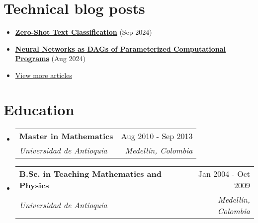 \documentclass[letterpaper,11pt]{article}
\makeatletter
\newcommand{\resumeSubheading}[4]{
  \vspace{-2pt}
  \item[]
  \begin{tabular*}{\textwidth}{@{\extracolsep{\fill}}l r}
    \textbf{#1} & #2 \\
    \textit{#3} & \textit{#4} \\
  \end{tabular*}
  \vspace{-5pt}
}
\newcommand{\normalfaExternalLink}{{\mdseries\faExternalLink}}
\makeatother
\begin{document}
\section{Technical blog posts}
\begin{itemize}[leftmargin=*]
    \item \textbf{\href{https://www.asanchezyali.com/blog/ai/20240917ZeroShot}{Zero-Shot Text Classification}} (Sep 2024)
    \item \textbf{\href{https://www.asanchezyali.com/blog/differentiable-programming/20240923DifferentiablePrograms}{Neural Networks as DAGs of Parameterized Computational Programs}} (Aug 2024)
    \item \href{https://www.asanchezyali.com/}{View more articles \normalfaExternalLink}
\end{itemize}

\section{Education}
\begin{itemize}[leftmargin=0pt, itemindent=0pt, label={}]
\resumeSubheading
{Master in Mathematics}{Aug 2010 - Sep 2013}
{Universidad de Antioquia}{Medellín, Colombia}

\resumeSubheading
{B.Sc. in Teaching Mathematics and Physics}{Jan 2004 - Oct 2009}
{Universidad de Antioquia}{Medellín, Colombia}
\end{itemize}
\end{document}

